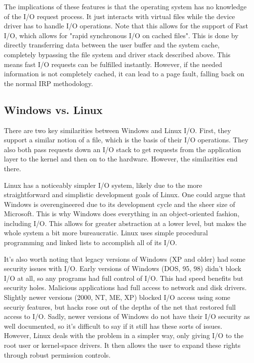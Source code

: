 \documentclass[draftclsnofoot,onecolumn,journal,letterpaper,10pt]{IEEEtran}
\begin{document}
The implications of these features is that the operating system has no knowledge of the I/O request process. It just interacts with virtual files while the device driver has to handle I/O operations. Note that this allows for the support of Fast I/O, which allows for "rapid synchronous I/O on cached files"\cite{windowsfastio}. This is done by directly transferring data between the user buffer and the system cache, completely bypassing the file system and driver stack described above. This means fast I/O requests can be fulfilled instantly. However, if the needed information is not completely cached, it can lead to a page fault, falling back on the normal IRP methodology. 

\subsection{Windows vs. Linux}

There are two key similarities between Windows and Linux I/O. First, they support a similar notion of a file, which is the basis of their I/O operations. They also both pass requests down an I/O stack to get requests from the application layer to the kernel and then on to the hardware. However, the similarities end there.

Linux has a noticeably simpler I/O system, likely due to the more straightforward and simplistic development goals of Linux. One could argue that Windows is overengineered due to its development cycle and the sheer size of Microsoft. This is why Windows does everything in an object-oriented fashion, including I/O. This allows for greater abstraction at a lower level, but makes the whole system a bit more bureaucratic. Linux uses simple procedural programming and linked lists to accomplish all of its I/O.\cite{linuxio} 

It's also worth noting that legacy versions of Windows (XP and older) had some security issues with I/O. Early versions of Windows (DOS, 95, 98) didn't block I/O at all, so any programs had full control of I/O. This had speed benefits but security holes. Malicious applications had full access to network and disk drivers. Slightly newer versions (2000, NT, ME, XP) blocked I/O access using some securiy features, but hacks rose out of the depths of the net that restored full access to I/O. Sadly, newer versions of Windows do not have their I/O security as well documented, so it's difficult to say if it still has these sorts of issues. However, Linux deals with the problem in a simpler way, only giving I/O to the root user or kernel-space drivers. It then allows the user to expand these rights through robust permission controls.\cite{iosecurity} 
\end{document}
